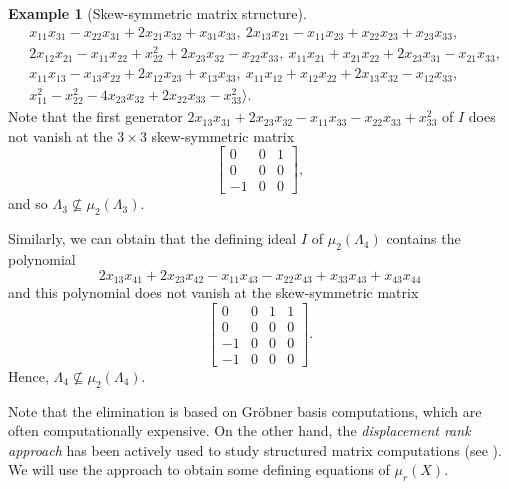 \documentclass[reqno]{amsart}
\theoremstyle{definition}
\newtheorem{example}[theorem]{Example}
\numberwithin{equation}{section}
\begin{document}
\begin{example}[Skew-symmetric matrix structure]
\begin{equation*}
\begin{aligned}
        &x_{11}x_{31}-x_{22}x_{31}+2x_{21}x_{32}+x_{31}x_{33},~2x_{13}x_{21}-x_{11}x_{23}+x_{22}x_{23}+x_{23}x_{33},\\
        &2x_{12}x_{21}-x_{11}x_{22}+x_{22}^2+2x_{23}x_{32}-x_{22}x_{33},~x_{11}x_{21}+x_{21}x_{22}+2x_{23}x_{31}-x_{21}x_{33},\\
        &x_{11}x_{13}-x_{13}x_{22}+2x_{12}x_{23}+x_{13}x_{33},~x_{11}x_{12}+x_{12}x_{22}+2x_{13}x_{32}-x_{12}x_{33},\\
        &x_{11}^2-x_{22}^2-4x_{23}x_{32}+2x_{22}x_{33}-x_{33}^2\rangle.
    \end{aligned}
    \end{equation*}
    Note that the first generator $2x_{13}x_{31}+2x_{23}x_{32}-x_{11}x_{33}-x_{22}x_{33}+x_{33}^2$ of $I$ does not vanish at the $3 \times 3$ skew-symmetric matrix 
    \begin{equation*}
        \begin{bmatrix}
            0 & 0 & 1\\
            0 & 0 & 0 \\
            -1 & 0 & 0
        \end{bmatrix},
    \end{equation*}
    and so $\Lambda_3 \nsubseteq \mu_2(\Lambda_3)$. 

    Similarly, we can obtain that the defining ideal $I$ of $\mu_2(\Lambda_4)$ contains the polynomial
    \begin{equation*}
        2x_{13}x_{41}+2x_{23}x_{42}-x_{11}x_{43}-x_{22}x_{43}+x_{33}x_{43}+x_{43}x_{44}
    \end{equation*}
    and this polynomial does not vanish at the skew-symmetric matrix 
    \begin{equation*}
        \begin{bmatrix}
            0 & 0 & 1 & 1\\
            0 & 0 & 0 & 0 \\
            -1 & 0 & 0 & 0\\
            -1 & 0 & 0 & 0
        \end{bmatrix}.
    \end{equation*}
    Hence, $\Lambda_4 \nsubseteq \mu_2(\Lambda_4)$. 
\end{example}

Note that the elimination is based on Gr\"obner basis computations, which are often computationally expensive. On the other hand, the \emph{displacement rank approach} has been actively used to study structured matrix computations (see \cite{MR533501, MR1843842}). We will use the approach to obtain some defining equations of $\mu_r(X)$.
\end{document}
